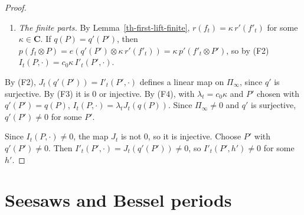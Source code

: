 \begin{proof}
\begin{enumerate}
  Lemma~\ref{th-first-lift-irreducible} gives $I'_t(P'',\cdot)=0$.
\item[(F4)] \emph{The finite parts.} By Lemma~\ref{th-first-lift-finite},
  $r(f_t)=\kappa\,r'(f'_t)$ for some $\kappa\in\mathbf C$. If $q(P)=q'(P')$,
  then $p(f_t\otimes P)=e(q'(P')\otimes\kappa\,r'(f'_t))=\kappa\,p'(f'_t\otimes P')$,
  so by (F2) $I_t(P,\cdot)=c_0\kappa\,I'_t(P',\cdot)$.
\end{enumerate}
By (F2), $J_t(q'(P'))=I'_t(P',\cdot)$ defines a linear map on $\Pi_\infty$,
since $q'$ is surjective. By (F3) it is $0$ or injective. By (F4), with
$\lambda_t=c_0\kappa$ and $P'$ chosen with $q'(P')=q(P)$,
$I_t(P,\cdot)=\lambda_tJ_t(q(P))$. Since $\Pi_\infty\neq0$ and $q'$ is
surjective, $q'(P')\neq0$ for some $P'$.

Since $I_t(P,\cdot)\neq0$, the map $J_t$ is not $0$, so it is injective. Choose
$P'$ with $q'(P')\neq0$. Then $I'_t(P',\cdot)=J_t(q'(P'))\neq0$, so
$I'_t(P',h')\neq0$ for some $h'$.
\end{proof}

\section{Seesaws and Bessel periods}\label{section-th-seesaw}

